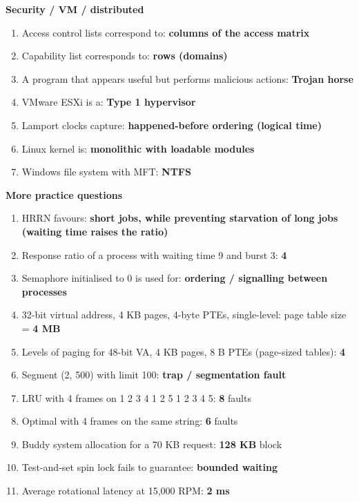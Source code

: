 \textbf{Security / VM / distributed}

\begin{enumerate}
\def\labelenumi{\arabic{enumi}.}
\setcounter{enumi}{42}
\tightlist
\item
  Access control lists correspond to: \textbf{columns of the access matrix}
\item
  Capability list corresponds to: \textbf{rows (domains)}
\item
  A program that appears useful but performs malicious actions: \textbf{Trojan horse}
\item
  VMware ESXi is a: \textbf{Type 1 hypervisor}
\item
  Lamport clocks capture: \textbf{happened-before ordering (logical time)}
\item
  Linux kernel is: \textbf{monolithic with loadable modules}
\item
  Windows file system with MFT: \textbf{NTFS}
\end{enumerate}

\textbf{More practice questions}

\begin{enumerate}
\def\labelenumi{\arabic{enumi}.}
\setcounter{enumi}{49}
\tightlist
\item
  HRRN favours: \textbf{short jobs, while preventing starvation of long jobs (waiting time raises the ratio)}
\item
  Response ratio of a process with waiting time 9 and burst 3: \textbf{4}
\item
  Semaphore initialised to 0 is used for: \textbf{ordering / signalling between processes}
\item
  32-bit virtual address, 4 KB pages, 4-byte PTEs, single-level: page table size = \textbf{4 MB}
\item
  Levels of paging for 48-bit VA, 4 KB pages, 8 B PTEs (page-sized tables): \textbf{4}
\item
  Segment (2, 500) with limit 100: \textbf{trap / segmentation fault}
\item
  LRU with 4 frames on 1 2 3 4 1 2 5 1 2 3 4 5: \textbf{8} faults
\item
  Optimal with 4 frames on the same string: \textbf{6} faults
\item
  Buddy system allocation for a 70 KB request: \textbf{128 KB} block
\item
  Test-and-set spin lock fails to guarantee: \textbf{bounded waiting}
\item
  Average rotational latency at 15,000 RPM: \textbf{2 ms}
\end{enumerate}

